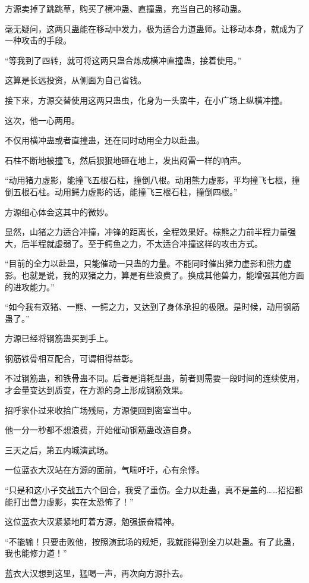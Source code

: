 \begin{this_body}
方源卖掉了跳跳草，购买了横冲蛊、直撞蛊，充当自己的移动蛊。

毫无疑问，这两只蛊能在移动中发力，极为适合力道蛊师。让移动本身，就成为了一种攻击的手段。

“等我到了四转，就可将这两只蛊合炼成横冲直撞蛊，接着使用。”

这算是长远投资，从侧面为自己省钱。

接下来，方源交替使用这两只蛊虫，化身为一头蛮牛，在小广场上纵横冲撞。

这次，他一心两用。

不仅用横冲蛊或者直撞蛊，还在同时动用全力以赴蛊。

石柱不断地被撞飞，然后狠狠地砸在地上，发出闷雷一样的响声。

“动用猪力虚影，能撞飞五根石柱，撞倒八根。动用熊力虚影，平均撞飞七根，撞倒五根石柱。动用鳄力虚影的话，能撞飞三根石柱，撞倒四根。”

方源细心体会这其中的微妙。

显然，山猪之力适合冲撞，冲锋的距离长，全程效果好。棕熊之力前半程力量强大，后半程就虚弱了。至于鳄鱼之力，不太适合冲撞这样的攻击方式。

“目前的全力以赴蛊，只能催动一只蛊的力量。不能同时催出猪力虚影和熊力虚影。也就是说，我的双猪之力，算是有些浪费了。换成其他兽力，能增强其他方面的进攻能力。”

“如今我有双猪、一熊、一鳄之力，又达到了身体承担的极限。是时候，动用钢筋蛊了。”

方源已经将钢筋蛊买到手上。

钢筋铁骨相互配合，可谓相得益彰。

不过钢筋蛊，和铁骨蛊不同。后者是消耗型蛊，前者则需要一段时间的连续使用，才会量变达到质变，在方源的身上形成钢筋效果。

招呼家仆过来收拾广场残局，方源便回到密室当中。

他一分一秒都不想浪费，开始催动钢筋蛊改造自身。

三天之后，第五内城演武场。

一位蓝衣大汉站在方源的面前，气喘吁吁，心有余悸。

“只是和这小子交战五六个回合，我受了重伤。全力以赴蛊，真不是盖的……招招都能打出兽力虚影，实在太恐怖了！”

这位蓝衣大汉紧紧地盯着方源，勉强振奋精神。

“不能输！只要击败他，按照演武场的规矩，我就能得到全力以赴蛊。有了此蛊，我也能修力道！”

蓝衣大汉想到这里，猛喝一声，再次向方源扑去。


\end{this_body}
